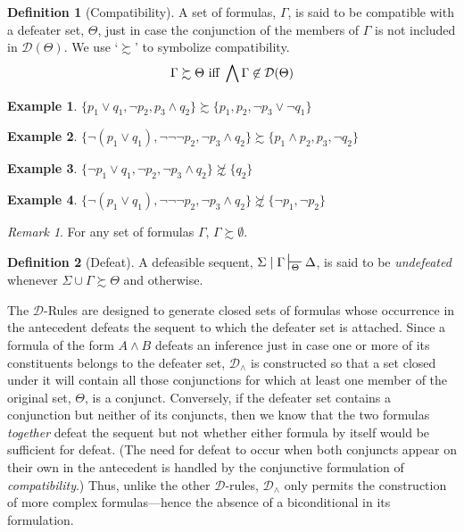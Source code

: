 \documentclass{article}
\theoremstyle{definition}
\theoremstyle{definition}
\theoremstyle{definition}
\theoremstyle{definition}
\newtheorem{definition}{Definition}
\theoremstyle{remark}
\newtheorem{remark}{Remark}
\theoremstyle{definition}
\newtheorem{example}{Example}
\theoremstyle{definition}
\begin{document}
\begin{definition}[Compatibility]\label{compat}
	A set of formulas, $\Gamma$, is said to be compatible with a defeater set, $\Theta $, just in case the conjunction of the members of $\Gamma$ is not included in $\mathcal{D}(\Theta)$. We use `$\succsim$' to symbolize compatibility.
 $$\Gamma \succsim \Theta \text{\,\,iff\,\,}  \bigwedge\Gamma \not\in \mathcal{D}(\Theta) $$

	
	\vspace{2mm}
	
	\begin{example}
		$ \{ p_1 \vee q_1,  \neg p_2, p_3 \wedge q_2 \} \succsim \{ p_1 , p_2, \neg p_3 \vee \neg q_1\} $
	\end{example}
	
	\begin{example}
		$ \{ \neg (p_1 \vee q_1),  \neg\neg\neg p_2, \neg p_3 \wedge q_2 \} \succsim \{ p_1 \wedge p_2 , p_3 , \neg q_2 \} $
	\end{example}
	
	\begin{example}
		$ \{ \neg p_1 \vee q_1,  \neg p_2, \neg p_3 \wedge q_2 \} \not\succsim \{ q_2 \} $
	\end{example}
	
	\begin{example}
		$ \{ \neg (p_1 \vee q_1),  \neg\neg\neg p_2, \neg p_3 \wedge q_2 \} \not\succsim \{ \neg p _1 , \neg p_2 \} $
	\end{example}
	
\end{definition}

\begin{remark}
	For any set of formulas $ \Gamma $, $ \Gamma \succsim \emptyset $.
\end{remark}


\begin{definition}[Defeat]\label{defeat}
	A defeasible sequent, $ \Sigma\mid\Gamma \sststile{\Theta}{} \Delta $, is said to be \textit{undefeated} whenever $ \Sigma\cup\Gamma\succsim\Theta$ and  otherwise.
\end{definition}

The $ \mathcal{D}$-Rules are designed to generate closed sets of formulas whose occurrence in the antecedent defeats the sequent to which the defeater set is attached. Since a formula of the form $ A\wedge B $ defeats an inference just in case one or more of its constituents belongs to the defeater set,  $ \mathcal{D}_{\wedge} $ is constructed so that a set closed under it will contain all those conjunctions for which at least one member of the original set, $ \Theta $, is a conjunct. Conversely, if the defeater set contains a conjunction but neither of its conjuncts, then we know that the two formulas \textit{together} defeat the sequent but not whether either formula by itself would be sufficient for defeat. (The need for defeat to occur when both conjuncts appear on their own in the antecedent is handled by the conjunctive formulation of \textit{compatibility}.) Thus, unlike the other $ \mathcal{D} $-rules, $ \mathcal{D}_{\wedge} $ only permits the construction of more complex formulas---hence the absence of a biconditional in its formulation. 
\end{document}
